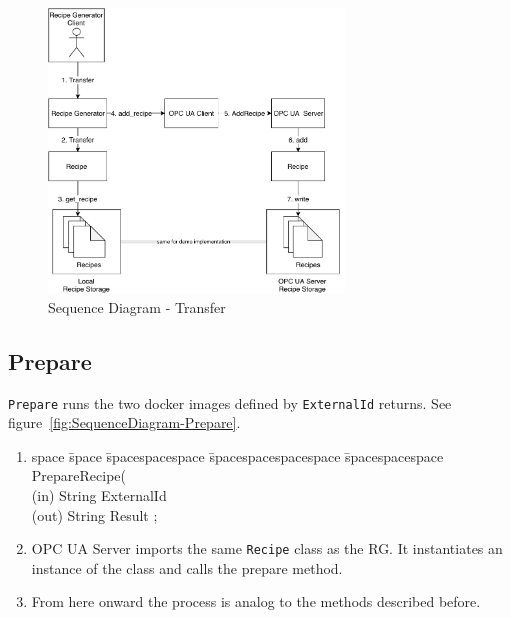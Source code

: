 \begin{figure}[ht]
	\centering
  \includegraphics[width=0.7\textwidth]{img/SequenceDiagram-Transfer.pdf}
	\caption{Sequence Diagram - Transfer}
	\label{fig:SequenceDiagram-Transfer}
\end{figure}

\subsection{Prepare}
\texttt{Prepare} runs the two docker images defined by \texttt{ExternalId} returns. See figure~\ref{fig:SequenceDiagram-Prepare}.

\begin{enumerate}
    \item 
    \begin{tabbing}
    space \= space \= spacespacespace \= spacespacespacespace \= spacespacespace \kill
    \>  PrepareRecipe(\\
    \>  \>  (in)	 \> 	String          \> ExternalId\\
    \>  \>  (out)	 \> 	String          \> Result ; 
    \end{tabbing}
    \item OPC UA Server imports the same \texttt{Recipe} class as the RG. It instantiates an instance of the class and calls the prepare method.
    \item From here onward the process is analog to the methods described before.
\end{enumerate}

